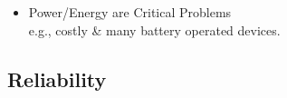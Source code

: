 \documentclass{beamer}
\newcommand{\emp}[1]{\textcolor{DikuRed}{ #1}}
\begin{document}
\begin{frame}[fragile,t]
\begin{itemize}
    \item \emp{Power/Energy are Critical Problems}\\ 
                e.g., costly \& many battery operated devices.
%
\end  {itemize}


\end{frame}


\subsection{Reliability}
\end{document}
